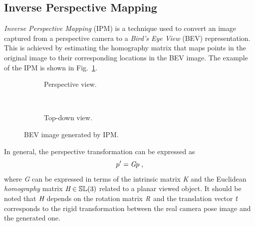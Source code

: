 \documentclass[graybox]{svmult}
\makeatletter
\def\tikzgridtransform{%
  \pgfextract@process\tikz@current@point{}%
  \pgf@process{%
    \pgfpointdiff{\tikz@transform@source@southwest}%
      {\tikz@transform@source@northeast}%
  }%
  \pgf@xc=\pgf@x\pgf@yc=\pgf@y%
  \pgf@process{%
    \pgfpointdiff{\tikz@transform@source@southwest}{\tikz@current@point}%
  }%
  \pgfmathparse{\pgf@x/\pgf@xc}\let\tikz@tx=\pgfmathresult%
  \pgfmathparse{\pgf@y/\pgf@yc}\let\tikz@ty=\pgfmathresult%
  \pgfpointlineattime{\tikz@ty}{%
    \pgfpointlineattime{\tikz@tx}{\tikz@transform@target@southwest}%
      {\tikz@transform@target@southeast}}{%
    \pgfpointlineattime{\tikz@tx}{\tikz@transform@target@northwest}%
      {\tikz@transform@target@northeast}}%
}
\makeatother
\begin{document}
\subsection{Inverse Perspective Mapping}
\emph{Inverse Perspective Mapping} (IPM) is a technique used to convert an image captured from a perspective camera to a \emph{Bird’s Eye View} (BEV) representation. This is achieved by estimating the homography matrix that maps points in the original image to their corresponding locations in the BEV image.
The example of the IPM is shown in Fig.~\ref{fig:ipm}.

\begin{figure}[h]
    \centering
    \begin{subfigure}[t]{0.5\textwidth}
        \centering
            \resizebox{.8\textwidth}{!}{%
            \begin{tikzpicture}
                \begin{scope}[
                grid source opposite corners={(0,0) and (6,6)},
                grid target corners={(1,1) -- (7,1) -- (5,3) -- (3,3)}]
            \pgftransformnonlinear\tikzgridtransform
            \draw (0,0) grid (6,6);
            \fill [even odd rule, opacity=0.5] 
         (3,3) circle [radius=2] circle [radius=1.5];
        \end{scope}
        \end{tikzpicture}
            }
        \caption{Perspective view.}
    \end{subfigure}%
    ~ 
    \begin{subfigure}[t]{0.5\textwidth}
        \centering
         \caption{Top-down view.}
    \end{subfigure}
    \caption{BEV image generated by IPM.}
    \label{fig:ipm}
\end{figure}


In general, the perspective transformation can be expressed as 
\begin{equation}
p' =  \emph{G} p
\label{eq:ipm} \; ,
\end{equation} 
where \emph{G} can be expressed in terms of the
intrinsic matrix \emph{K} and the Euclidean \emph{homography} matrix
$\emph{H} \in \mathbb{SL}(3)$ related to a planar viewed object. It should be noted that $\emph{H}$
depends on the rotation matrix $\emph{R}$ and the translation vector
$\emph{t}$ corresponds to the rigid transformation between the real camera pose image and the generated one.
\end{document}
